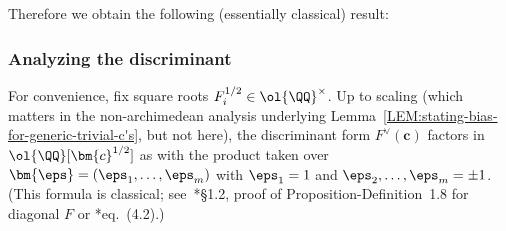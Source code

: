 \documentclass[12pt]{report}
\begin{document}
Therefore we obtain the following (essentially classical) result:


\subsubsection{Analyzing the discriminant}

For convenience,
fix square roots $F_i^{1/2}\in\ol{\QQ}^\times$.
Up to scaling
(which matters in the non-archimedean analysis underlying Lemma~\ref{LEM:stating-bias-for-generic-trivial-c's},
but not here),
the discriminant form $F^\vee(\bm{c})$ factors in $\ol{\QQ}[\bm{c}^{1/2}]$ as
with the product taken over $\bm{\eps} = (\eps_1,\dots,\eps_m)$ with $\eps_1=1$ and $\eps_2,\dots,\eps_m=\pm1$.
(This formula is classical;
see~\cite{wang2021_large_sieve_diagonal_cubic_forms}*{\S1.2, proof of Proposition-Definition~1.8 for diagonal $F$} or \cite{heath1998circle}*{eq.~(4.2)}.)


\end{document}
